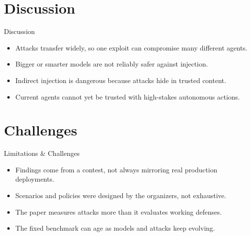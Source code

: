 \documentclass[10pt]{beamer}
\begin{document}
\section{Discussion}
\begin{frame}{Discussion}
\begin{itemize}
  \item Attacks transfer widely, so one exploit can compromise many different agents.
  \item Bigger or smarter models are not reliably safer against injection.
  \item Indirect injection is dangerous because attacks hide in trusted content.
  \item Current agents cannot yet be trusted with high-stakes autonomous actions.
\end{itemize}
\end{frame}
\section{Challenges}
\begin{frame}{Limitations \& Challenges}
\begin{itemize}
  \item Findings come from a contest, not always mirroring real production deployments.
  \item Scenarios and policies were designed by the organizers, not exhaustive.
  \item The paper measures attacks more than it evaluates working defenses.
  \item The fixed benchmark can age as models and attacks keep evolving.
\end{itemize}
\end{frame}
\end{document}
